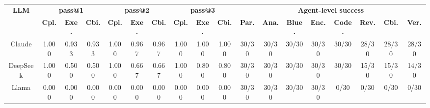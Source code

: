 \begin{tabular}{c|ccc|ccc|ccc|cccccccc}
    \toprule[1pt]
    \textbf{LLM} & \multicolumn{3}{c|}{\textbf{pass@1}} & \multicolumn{3}{c|}{\textbf{pass@2}} & \multicolumn{3}{c|}{\textbf{pass@3}} & \multicolumn{8}{c}{\textbf{Agent-level success}} \\
    \cmidrule(lr){2-4} \cmidrule(lr){5-7} \cmidrule(lr){8-10} \cmidrule(lr){11-18}
    & \textbf{Cpl.} & \textbf{Exe.} & \textbf{Cbi.} & \textbf{Cpl.} & \textbf{Exe.} & \textbf{Cbi.} & \textbf{Cpl.} & \textbf{Exe.} & \textbf{Cbi.} & \textbf{Par.} & \textbf{Ana.} & \textbf{Blue.} & \textbf{Enc.} & \textbf{Code.} & \textbf{Rev.} & \textbf{Cbi.} & \textbf{Ver.} \\
    \cmidrule(lr){1-1} \cmidrule(lr){2-2} \cmidrule(lr){3-3} \cmidrule(lr){4-4} \cmidrule(lr){5-5} \cmidrule(lr){6-6} \cmidrule(lr){7-7} \cmidrule(lr){8-8} \cmidrule(lr){9-9} \cmidrule(lr){10-10} \cmidrule(lr){11-11} \cmidrule(lr){12-12} \cmidrule(lr){13-13} \cmidrule(lr){14-14} \cmidrule(lr){15-15} \cmidrule(lr){16-16} \cmidrule(lr){17-17} \cmidrule(lr){18-18}
    Claude & 1.000 & 0.933 & 0.933 & 1.000 & 0.967 & 0.967 & 1.000 & 1.000 & 1.000 & 30/30 & 30/30 & 30/30 & 30/30 & 30/30 & 28/30 & 28/30 & 28/30 \\
    DeepSeek & 1.000 & 0.500 & 0.500 & 1.000 & 0.667 & 0.667 & 1.000 & 0.800 & 0.800 & 30/30 & 30/30 & 30/30 & 30/30 & 30/30 & 15/30 & 15/30 & 14/30 \\
    Llama & 0.000 & 0.000 & 0.000 & 0.000 & 0.000 & 0.000 & 0.000 & 0.000 & 0.000 & 30/30 & 30/30 & 30/30 & 30/30 & 0/30 & 0/30 & 0/30 & 0/30 \\
    \bottomrule[1pt]
\end{tabular}
